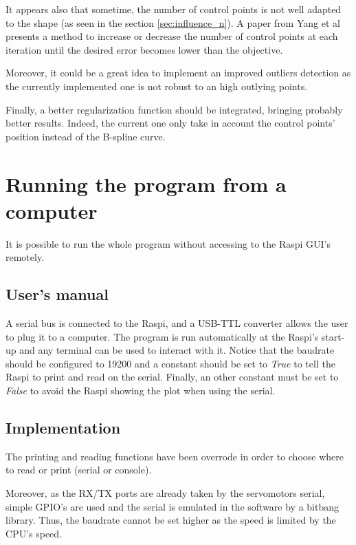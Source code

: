 \documentclass{article}
\newcommand{\vsp}{\vspace{\baselineskip}}
\begin{document}
\vsp

It appears also that sometime, the number of control points is not well adapted to the shape (as seen in the section \ref{sec:influence_n}). A paper from Yang et al \cite{adjustement_ctrl_points} presents a method to increase or decrease the number of control points at each iteration until the desired error becomes lower than the objective.

\vsp

Moreover, it could be a great idea to implement an improved outliers detection as the currently implemented one is not robust to an high outlying points.

\vsp

Finally, a better regularization function should be integrated, bringing probably better results. Indeed, the current one only take in account the control points' position instead of the B-spline curve. 


\section{Running the program from a computer}

It is possible to run the whole program without accessing to the Raspi GUI's remotely.

\subsection{User's manual}

A serial bus is connected to the Raspi, and a USB-TTL converter allows the user to plug it to a computer. The program is run automatically at the Raspi's start-up and any terminal can be used to interact with it. Notice that the baudrate should be configured to 19200 and a constant should be set to \textit{True} to tell the Raspi to print and read on the serial. Finally, an other constant must be set to \textit{False} to avoid the Raspi showing the plot when using the serial.  

\subsection{Implementation}

The printing and reading functions have been overrode in order to choose where to read or print (serial or console). 

\vsp

Moreover, as the RX/TX ports are already taken by the servomotors serial, simple GPIO's are used and the serial is emulated in the software by a bitbang library. Thus, the baudrate cannot be set higher as the speed is limited by the CPU's speed.  

\newpage
\listoffigures
\listoftables


\newpage


\end{document}
